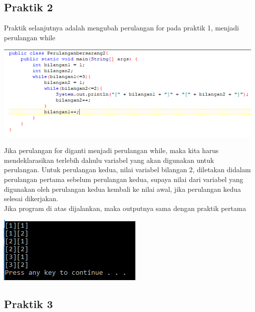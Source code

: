 \documentclass[a4paper,12pt]{article}
\begin{document}
\subsection{Praktik 2}
Praktik selanjutnya adalah mengubah perulangan for pada praktik 1, menjadi perulangan while
\begin{center}
	\includegraphics[scale=.7]{capture3}
\end{center}
Jika perulangan for diganti menjadi perulangan while, maka kita harus mendeklarasikan terlebih dahulu variabel yang akan digunakan untuk perulangan. Untuk perulangan kedua, nilai variabel bilangan 2, diletakan didalam perulangan pertama sebelum perulangan kedua, supaya nilai dari variabel yang digunakan oleh perulangan kedua kembali ke nilai awal, jika perulangan kedua selesai dikerjakan.\\
Jika program di atas dijalankan, maka outputnya sama dengan praktik pertama
\begin{center}
	\includegraphics[scale=.7]{Capture4}
\end{center}

\subsection{Praktik 3}
\end{document}
